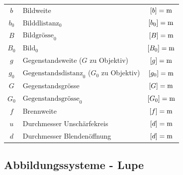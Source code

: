 \begin{tabular}{c l c}
	$b$ & Bildweite & $[b] = \mathrm{m}$ \\
	$b_0$ & $\text{Bilddlistanz}_0$ & $[b_0] = \mathrm{m}$ \\
	$B$ & $\text{Bildgrösse}_0$ & $[B] = \mathrm{m}$ \\
	$B_0$ & $\text{Bild}_0$ & $[B_0] = \mathrm{m}$ \\
	$g$ & Gegenstandsweite ($G$ zu Objektiv) & $[g] = \mathrm{m}$ \\
	$g_0$ & $\text{Gegenstandsdistanz}_0$ ($G_0$ zu Objektiv) & $[g_0] = \mathrm{m}$ \\
	$G$ & Gegenstandsgrösse & $[G] = \mathrm{m}$ \\
	$G_0$ & $\text{Gegenstandsgrösse}_0$ & $[G_0] = \mathrm{m}$ \\
	$f$ & Brennweite & $[f] = \mathrm{m}$ \\
	$u$ & Durchmesser Unschärfekreis & $[d] = \mathrm{m}$ \\
	$d$ & Durchmesser Blendenöffnung & $[d] = \mathrm{m}$
\end{tabular}






\subsection{Abbildungssysteme - Lupe}


